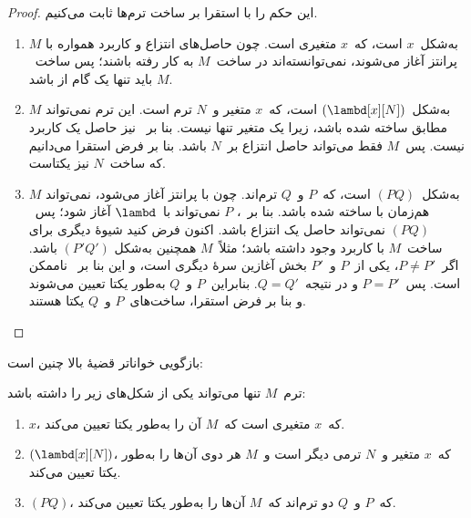 \documentclass[../../../include/open-logic-section]{subfiles}
\begin{document}
\begin{proof}
  این حکم را با استقرا بر ساخت ترم‌ها ثابت می‌کنیم.
  \begin{enumerate}
    \item $M$ به‌شکل~$x$ است، که~$x$ متغیری است. چون حاصل‌های انتزاع و
      کاربرد همواره با پرانتز آغاز می‌شوند، نمی‌توانسته‌اند در ساخت~$M$
      به کار رفته باشند؛ پس ساخت~$M$ باید تنها یک گام از
       باشد.
    \item $M$ به‌شکل~$(\lambd[x][N])$ است، که~$x$ متغیر و~$N$ ترم است.
      این ترم نمی‌تواند مطابق
       ساخته شده باشد،
      زیرا یک متغیر تنها نیست. بنا بر~ نیز حاصل یک
      کاربرد نیست. پس~$M$ فقط می‌تواند حاصل انتزاع بر~$N$ باشد. بنا بر
      فرض استقرا می‌دانیم که ساخت~$N$ نیز یکتاست.
    \item $M$ به‌شکل~$(PQ)$ است، که~$P$ و~$Q$ ترم‌اند. چون با پرانتز
      آغاز می‌شود، نمی‌تواند هم‌زمان با
       ساخته شده باشد.
      بنا بر~، $P$ نمی‌تواند با~$\lambd$ آغاز شود؛
      پس~$(PQ)$ نمی‌تواند حاصل یک انتزاع باشد. اکنون فرض کنید شیوهٔ دیگری
      برای ساخت~$M$ با کاربرد وجود داشته باشد؛ مثلاً~$M$ همچنین به‌شکل
      $(P'Q')$ باشد. اگر~$P \neq P'$، یکی از~$P$ و~$P'$ بخش آغازین سرهٔ
      دیگری است، و این بنا بر~ ناممکن است. پس~$P=P'$
      و در نتیجه~$Q=Q'$. بنابراین~$P$ و~$Q$ به‌طور یکتا تعیین می‌شوند و
      بنا بر فرض استقرا، ساخت‌های~$P$ و~$Q$ یکتا هستند.
  \end{enumerate}
\end{proof}

بازگویی خواناتر قضیهٔ بالا چنین است:
\begin{prop}
  ترم~$M$ تنها می‌تواند یکی از شکل‌های زیر را داشته باشد:
  \begin{enumerate}
    \item $x$، که~$x$ متغیری است که~$M$ آن را به‌طور یکتا تعیین می‌کند.
    \item $(\lambd[x][N])$، که~$x$ متغیر و~$N$ ترمی دیگر است و~$M$ هر
      دوی آن‌ها را به‌طور یکتا تعیین می‌کند.
    \item $(PQ)$، که~$P$ و~$Q$ دو ترم‌اند که~$M$ آن‌ها را به‌طور یکتا
      تعیین می‌کند.
  \end{enumerate}
\end{prop}
\end{document}
